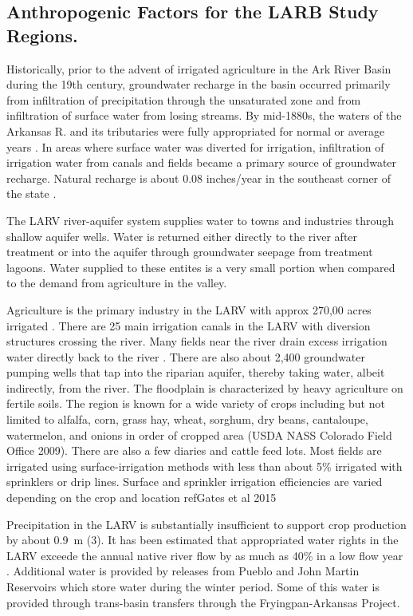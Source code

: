 \begin{linenumbers}[1]
\subsection*{Anthropogenic Factors for the LARB Study Regions.}

Historically, prior to the advent of irrigated agriculture in the Ark River Basin during the 19th century, groundwater recharge in the basin occurred primarily from infiltration of precipitation through the unsaturated zone and from infiltration of surface water from losing streams.  By mid-1880s, the waters of the Arkansas R. and its tributaries were fully appropriated for normal or average years \parencite{Abbott1985}.  In areas where surface water was diverted for irrigation, infiltration of irrigation water from canals and fields became a primary source of groundwater recharge.  Natural recharge is about 0.08 inches/year in the southeast corner of the state \parencite{Wolock2003}.

The LARV river-aquifer system supplies water to towns and industries through shallow aquifer wells.  Water is returned either directly to the river after treatment or into the aquifer through groundwater seepage from treatment lagoons.  Water supplied to these entites is a very small portion when compared to the demand from agriculture in the valley.

Agriculture is the primary industry in the LARV with approx 270,00 acres irrigated \parencite{Bailey2015,Miller2010}.  There are 25 main irrigation canals in the LARV with diversion structures crossing the river.  Many fields near the river drain excess irrigation water directly back to the river \parencite{Bailey2012,Morway2013}.  There are also about 2,400 groundwater pumping wells that tap into the riparian aquifer, thereby taking water, albeit indirectly, from the river.  The floodplain is characterized by heavy agriculture on fertile soils.  The region is known for a wide variety of crops including but not limited to alfalfa, corn, grass hay, wheat, sorghum, dry beans, cantaloupe, watermelon, and onions in order of cropped area (USDA NASS Colorado Field Office 2009).  There are also a few diaries and cattle feed lots.  Most fields are irrigated using surface-irrigation methods with less than about 5\% irrigated with sprinklers or drip lines.  Surface and sprinkler irrigation efficiencies are varied depending on the crop and location \parencite{Bailey2012Phd} ref{Gates et al 2015}

Precipitation in the LARV is substantially insufficient to support crop production by about \SI{0.9}{\meter} (\SI{3}{\foot}).  It has been estimated that appropriated water rights in the LARV exceede the annual native river flow by as much as 40\% in a low flow year \parencite{cain1985,sutherland1988}.  Additional water is provided by releases from Pueblo and John Martin Reservoirs which store water during the winter period.  Some of this water is provided through trans-basin transfers through the Fryingpan-Arkansas Project.


\end{linenumbers}
